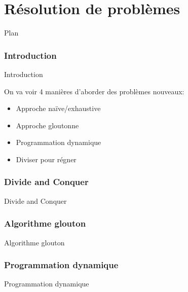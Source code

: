 \part{Résolution de problèmes}



\begin{frame}{Plan}

\tableofcontents

\end{frame}


\section{Introduction}

\begin{frame}{Introduction}

On va voir 4 manières d'aborder des problèmes nouveaux:
\begin{itemize}
\item Approche naïve/exhaustive
\item Approche gloutonne
\item Programmation dynamique
\item Diviser pour régner
\end{itemize}

\end{frame}

\section{Divide and Conquer}

\begin{frame}{Divide and Conquer}
\end{frame}

\section{Algorithme glouton}

\begin{frame}{Algorithme glouton}
\end{frame}

\section{Programmation dynamique}

\begin{frame}{Programmation dynamique}
\end{frame}

